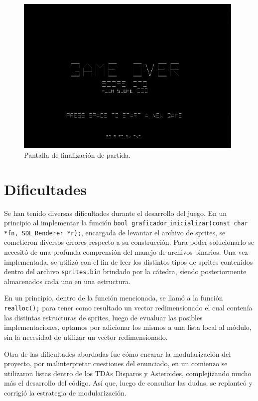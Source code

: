 \documentclass[a4paper, 12pt, spanish]{article}
\begin{document}
\begin{figure}[h!]
 	\centering
	\includegraphics[width=11cm]{game_over_screen}
	\caption{Pantalla de finalización de partida.}
\end{figure} 


\section*{Dificultades}

Se han tenido diversas dificultades durante el desarrollo del juego. En un principio al implementar la función \texttt{bool graficador$\_$inicializar(const char *fn, SDL$\_$Renderer *r);}, encargada de levantar el archivo de sprites, se cometieron diversos errores respecto a su construcción. Para poder solucionarlo se necesitó de una profunda comprensión del manejo de archivos binarios. Una vez implementada, se utilizó con el fin de leer los distintos tipos de sprites contenidos dentro del archivo \texttt{sprites.bin} brindado por la cátedra, siendo posteriormente almacenados cada uno en una estructura. 

\medskip
En un principio, dentro de la función mencionada, se llamó a la función \texttt{realloc();} para tener como resultado un vector redimensionado el cual contenía las distintas estructuras de sprites, luego de evualuar 
las posibles implementaciones, optamos por adicionar los mismos a una lista local al módulo, sin la necesidad de utilizar un vector redimensionado.

\medskip
Otra de las dificultades abordadas fue cómo encarar la modularización del proyecto, por malinterpretar cuestiones
del enunciado, en un comienzo se utilizaron listas dentro de los TDAs Disparos y Asteroides, complejizando mucho más el desarrollo del código. Así que, luego de consultar las dudas, se replanteó y corrigió la estrategia de modularización.
\end{document}
